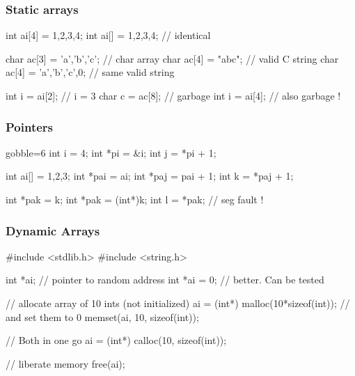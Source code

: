 \begin{frame}[fragile]
  \frametitle{Static arrays}
  \begin{cppcode*}{}
    int ai[4] = {1,2,3,4};
    int ai[] = {1,2,3,4};  // identical
    
    char ac[3] = {'a','b','c'};   // char array
    char ac[4] = "abc";           // valid C string
    char ac[4] = {'a','b','c',0}; // same valid string
    
    int i = ai[2];  // i = 3
    char c = ac[8]; // garbage
    int i = ai[4];  // also garbage !
  \end{cppcode*}
\end{frame}

\begin{frame}[fragile]
  \frametitle{Pointers}
  \begin{multicols}{2}
    \begin{cppcode*}{gobble=6}
      int i = 4;
      int *pi = &i;
      int j = *pi + 1;
      
      int ai[] = {1,2,3};
      int *pai = ai;
      int *paj = pai + 1;
      int k = *paj + 1;
      
      int *pak = k;
      int *pak = (int*)k;
      int l = *pak; // seg fault !
    \end{cppcode*}
  \end{multicols}
\end{frame}

\begin{frame}[fragile]
  \frametitle{Dynamic Arrays}
  \begin{cppcode*}{}
    #include <stdlib.h>
    #include <string.h>

    int *ai;     // pointer to random address
    int *ai = 0; // better. Can be tested

    // allocate array of 10 ints (not initialized)
    ai = (int*) malloc(10*sizeof(int));
    // and set them to 0
    memset(ai, 10, sizeof(int));

    // Both in one go
    ai = (int*) calloc(10, sizeof(int));
    
    // liberate memory
    free(ai);
  \end{cppcode*}
\end{frame}

